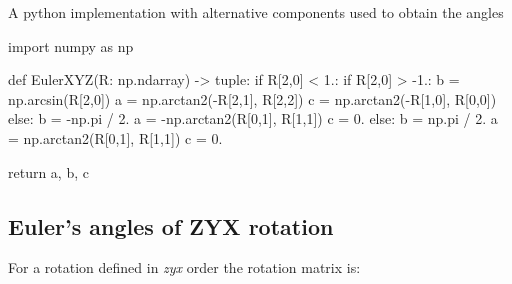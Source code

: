         A python implementation with alternative components used to obtain the angles
\begin{python}
import numpy as np

def EulerXYZ(R: np.ndarray) -> tuple:
    if R[2,0] < 1.:
        if R[2,0] > -1.:
            b = np.arcsin(R[2,0])
            a = np.arctan2(-R[2,1], R[2,2])
            c = np.arctan2(-R[1,0], R[0,0])
        else:
            b = -np.pi / 2.
            a = -np.arctan2(R[0,1], R[1,1])
            c = 0.
    else:
        b = np.pi / 2.
        a = np.arctan2(R[0,1], R[1,1])
        c = 0.

    return a, b, c
\end{python}


\subsection{Euler's angles of \textbf{ZYX} rotation}

        For a rotation defined in \textit{zyx} order the rotation matrix is:

